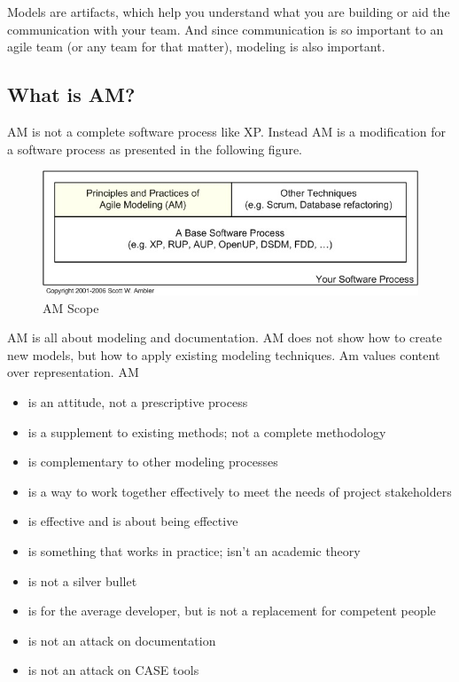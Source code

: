 Models are artifacts, which help you understand what you are building or aid the
communication with your team. And since communication is so important to an
agile team (or any team for that matter), modeling is also important.

\subsection{What is AM?}
AM is not a complete software process like XP. Instead AM is a modification for
a software process as presented in the following figure.
 \begin{figure}[h]
  \caption[AM Scope]{AM Scope\cite{AM}}
  \label{jee}
  \center
  	\includegraphics[scale=0.5]{../resources/amScope.jpg}
\end{figure}
AM is all about modeling and documentation. AM does not show how to create new
models, but how to apply existing modeling techniques. Am values content over
representation. AM
\begin{itemize}
\item is an attitude, not a prescriptive process
\item is a supplement to existing methods; not a complete methodology
\item is complementary to other modeling processes
\item is a way to work together effectively to meet the needs of project
stakeholders
\item is effective and is about being effective
\item is something that works in practice; isn't an academic theory
\item is not a silver bullet
\item is for the average developer, but is not a replacement for competent
people
\item is not an attack on documentation
\item is not an attack on CASE tools\cite{Ambler200204}
\end{itemize}

